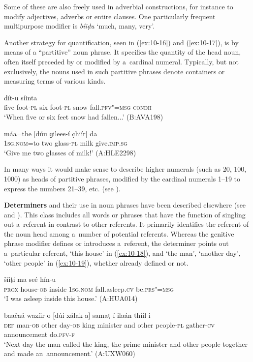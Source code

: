 Some of these are also freely used in adverbial constructions, for instance to modify adjectives, adverbs or entire clauses. One particularly frequent multipurpose modifier is \textit{bíiḍu} `much, many, very'.


Another strategy for quantification, seen in (\ref{ex:10-16}) and (\ref{ex:10-17}), is by means of a ``partitive'' noun phrase. It specifies the quantity of the head noun, often itself preceded by or modified by a~cardinal numeral. Typically, but not exclusively, the nouns used in such partitive phrases denote containers or measuring terms of various kinds.

\begin{exe}
\ex
\label{ex:10-16}
 dít-u síinta \\
five foot-\textsc{pl} six foot-\textsc{pl} snow fall.\textsc{pfv"=msg} \textsc{condh} \\
\glt `When five or six feet snow had fallen...' (B:AVA198)

\ex
\label{ex:10-17}
\gll máa=the [dúu ɡilees-í c̣hiír] da \\
\textsc{1sg}.\textsc{nom}=to two glass-\textsc{pl} milk give.\textsc{imp.sg} \\
\glt `Give me two glasses of milk!' (A:HLE2298)
\end{exe}

In many ways it would make sense to describe higher numerals (such as 20, 100, 1000) as heads of partitive phrases, modified by the cardinal numerals 1--19 to express the numbers 21--39, etc. (see ).


\textbf{Determiners} and their use in noun phrases have been described elsewhere (see  and ). This class includes all words or phrases that have the function of singling out a~referent in contrast to other referents. It primarily identifies the referent of the noun head among a~number of potential referents. Whereas the genitive phrase modifier defines or introduces a~referent, the determiner points out a~particular referent, `this house' in (\ref{ex:10-18}), and `the man', `another day', `other people' in (\ref{ex:10-19}), whether already defined or not.

\begin{exe}
\ex
\label{ex:10-18}
 šíiṭi ma seé hín-u\\
\textsc{prox} house-\textsc{ob} inside \textsc{1sg.nom} fall.asleep.\textsc{cv} be.\textsc{prs"=msg} \\
\glt `I was asleep inside this house.' (A:HUA014)

\ex
\label{ex:10-19}
 baačaá wazíir o [dúi xálak-a] samaṭ-í ilaán thíil-i \\
\textsc{def} man-\textsc{ob} other day-\textsc{ob} king minister and other  people-\textsc{pl} gather-\textsc{cv} announcement do.\textsc{pfv-f}  \\
\glt `Next day the man called the king, the prime minister and other people together and made an~announcement.' (A:UXW060)
\end{exe}

